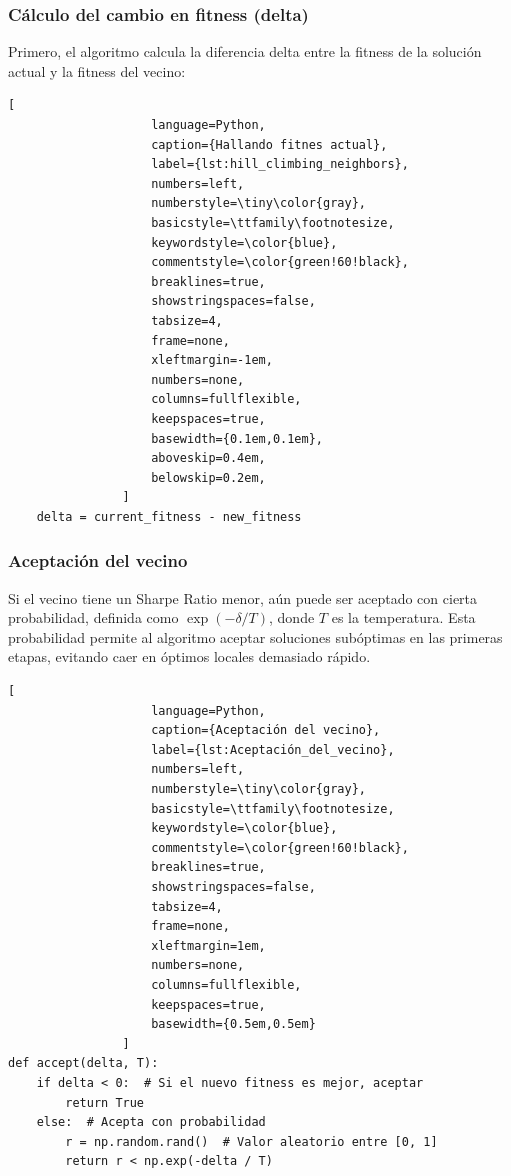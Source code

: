 \documentclass[9pt,a4paper,twoside]{rho-class/rho}
\begin{document}
            \subsubsection{Cálculo del cambio en fitness (delta)}
                Primero, el algoritmo calcula la diferencia delta entre la fitness de la solución actual y la fitness del vecino:
                \begin{lstlisting}[
                    language=Python,
                    caption={Hallando fitnes actual},
                    label={lst:hill_climbing_neighbors},
                    numbers=left,
                    numberstyle=\tiny\color{gray},
                    basicstyle=\ttfamily\footnotesize,
                    keywordstyle=\color{blue},
                    commentstyle=\color{green!60!black},
                    breaklines=true,
                    showstringspaces=false,
                    tabsize=4,
                    frame=none,
                    xleftmargin=-1em,
                    numbers=none,
                    columns=fullflexible,
                    keepspaces=true,
                    basewidth={0.1em,0.1em},
                    aboveskip=0.4em,
                    belowskip=0.2em,
                ]
    delta = current_fitness - new_fitness
                \end{lstlisting}
            \subsubsection{Aceptación del vecino}
                Si el vecino tiene un Sharpe Ratio menor, aún puede ser aceptado con cierta probabilidad, definida como $\exp(-\delta/T)$, donde $T$ es la temperatura. Esta probabilidad permite al algoritmo aceptar soluciones subóptimas en las primeras etapas, evitando caer en óptimos locales demasiado rápido.
                \begin{lstlisting}[
                    language=Python,
                    caption={Aceptación del vecino},
                    label={lst:Aceptación_del_vecino},
                    numbers=left,
                    numberstyle=\tiny\color{gray},
                    basicstyle=\ttfamily\footnotesize,
                    keywordstyle=\color{blue},
                    commentstyle=\color{green!60!black},
                    breaklines=true,
                    showstringspaces=false,
                    tabsize=4,
                    frame=none,
                    xleftmargin=1em,
                    numbers=none,
                    columns=fullflexible,
                    keepspaces=true,
                    basewidth={0.5em,0.5em}
                ]
def accept(delta, T):
    if delta < 0:  # Si el nuevo fitness es mejor, aceptar
        return True
    else:  # Acepta con probabilidad
        r = np.random.rand()  # Valor aleatorio entre [0, 1]
        return r < np.exp(-delta / T)
                \end{lstlisting}
\end{document}
